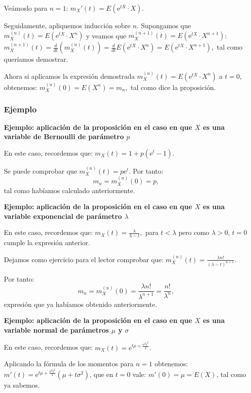 \documentclass[]{book}
\begin{document}
Veámoslo para \(n=1\): \(m_X'(t)=E\left(\mathrm{e}^{tX}\cdot X\right)\).

Seguidamente, apliquemos inducción sobre \(n\). Supongamos que \(m_X^{(n)}(t) =E\left(\mathrm{e}^{tX}\cdot X^n\right)\) y veamos que \(m_X^{(n+1)}(t) =E\left(\mathrm{e}^{tX}\cdot X^{n+1}\right)\):
\(m_X^{(n+1)}(t) =\frac{d}{dt}(m_X^{(n)}(t)) =\frac{d}{dt}E\left(\mathrm{e}^{tX}\cdot X^n\right) = E\left(\mathrm{e}^{tX}\cdot X^{n+1}\right),\)
tal como queríamos demostrar.

Ahora si aplicamos la expresión demostrada \(m_X^{(n)}(t) =E\left(\mathrm{e}^{tX}\cdot X^n\right)\) a \(t=0\), obtenemos:
\(m_X^{(n)}(0) =E\left(X^n\right)=m_n,\)
tal como dice la proposición.

\hypertarget{ejemplo}{%
\subsubsection{Ejemplo}\label{ejemplo}}

\textbf{Ejemplo: aplicación de la proposición en el caso en que \(X\) es una variable de Bernoulli de parámetro \(p\)}

En este caso, recordemos que: \(m_X (t)=1+p\left(\mathrm{e}^t -1 \right).\)

Se puede comprobar que \(m_X^{(n)}(t)=p\mathrm{e}^t\). Por tanto:
\[
m_n = m_X^{(n)}(0)=p,
\]
tal como habíamos calculado anteriormente.

\textbf{Ejemplo: aplicación de la proposición en el caso en que \(X\) es una variable exponencial de parámetro \(\lambda\)}

En este caso, recordemos que: \(m_X (t)=\frac{\lambda}{\lambda -t},\) para \(t<\lambda\) pero como \(\lambda >0\), \(t=0\) cumple la expresión anterior.

Dejamos como ejercicio para el lector comprobar que: \(m_X^{(n)}(t)=\frac{\lambda n!}{(\lambda-t)^{n+1}}\).

Por tanto:
\[
m_n = m_X^{(n)}(0) = \frac{\lambda n!}{\lambda^{n+1}}=\frac{n!}{\lambda^n},
\]
expresión que ya habíamos obtenido anteriormente.

\textbf{Ejemplo: aplicación de la proposición en el caso en que \(X\) es una variable normal de parámetros \(\mu\) y \(\sigma\)}

En este caso, recordemos que: \(m_X (t)=\mathrm{e}^{ t \mu +\frac{\sigma^2 t^2}{2}}.\)

Aplicando la fórmula de los momentos para \(n=1\) obtenemos:
\(m'(t)=\mathrm{e}^{ t \mu +\frac{\sigma^2 t^2}{2}} \left(\mu+t\sigma^2\right)\), que en \(t=0\) vale:
\(m'(0)=\mu=E(X)\), tal como ya sabemos.
\end{document}
